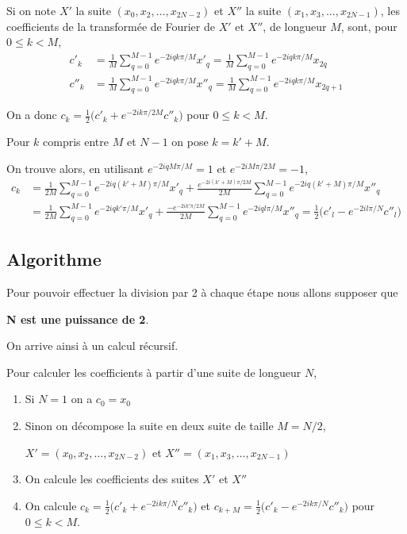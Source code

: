 Si on note $X'$ la suite $(x_0,x_2,\ldots,x_{2N-2})$ et $X''$ la suite $(x_1,x_3,\ldots,x_{2N-1})$, les coefficients de la transformée de Fourier de $X'$ et $X''$, de longueur $M$, sont, pour $0\le k < M$,
\begin{align*}
c'_k&=\frac 1{M}\sum_{q=0}^{M-1} e^{-2iqk\pi/M}x'_{q}=\frac 1{M}\sum_{q=0}^{M-1} e^{-2iqk\pi/M}x_{2q}\\
c''_k&=\frac 1{M}\sum_{q=0}^{M-1} e^{-2iqk\pi/M}x''_{q}=\frac 1{M}\sum_{q=0}^{M-1} e^{-2iqk\pi/M}x_{2q+1}
\end{align*}

On a donc $c_k = \frac 12\bigl(c'_k + e^{-2ik\pi/2M} c''_k\bigr)$ pour $0\le k < M$.

\medskip

Pour $k$ compris entre $M$ et $N-1$ on pose $k = k' + M$.

On trouve alors, en utilisant $e^{-2iqM\pi/M}=1$ et $e^{-2iM\pi/2M}=-1$,
\begin{align*}
c_k
&
=\frac 1{2M}\sum_{q=0}^{M-1} e^{-2iq(k'+M)\pi/M}x'_q + \frac {e^{-2i(k'+M)\pi/2M}}{2M}\sum_{q=0}^{M-1} e^{-2iq(k'+M)\pi/M}x''_q
\\&
=\frac 1{2M}\sum_{q=0}^{M-1} e^{-2iqk'\pi/M}x'_q + \frac {-e^{-2ik'\pi/2M}}{2M}\sum_{q=0}^{M-1} e^{-2iql\pi/M}x''_q
=\frac 12\bigl(c'_l - e^{-2il\pi/N} c''_l\bigr)
\end{align*}
\subsection{Algorithme}
Pour pouvoir effectuer la division par 2 à chaque étape nous allons supposer que 
\begin{center}
{\bf N est une puissance de 2}.
\end{center}

On arrive ainsi à un calcul récursif.

Pour calculer les coefficients à partir d'une suite de longueur $N$,

\begin{enumerate}
  \item Si $N=1$ on a $c_0=x_0$
  \item Sinon on décompose la suite en deux suite de taille $M=N/2$,

$X'=(x_0,x_2,\ldots,x_{2N-2})$ et $X''=(x_1,x_3,\ldots,x_{2N-1})$
\item On calcule les coefficients des suites $X'$ et $X''$
\item On calcule $c_k = \frac 12\bigl(c'_k + e^{-2ik\pi/N} c''_k\bigr)$ et $c_{k+M}=\frac 12\bigl(c'_k - e^{-2ik\pi/N} c''_k\bigr)$ pour $0\le k < M$.
\end{enumerate}

